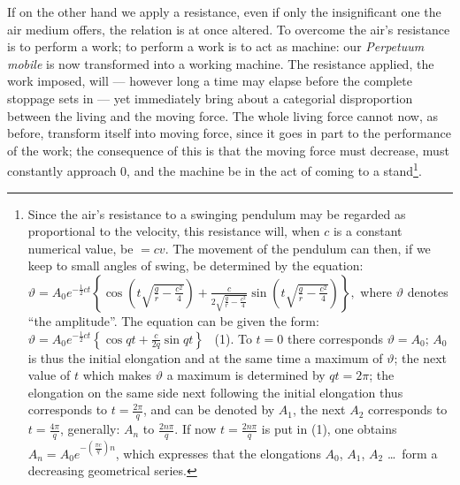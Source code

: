 \documentclass[12pt,a4paper]{book}
\begin{document}
If on the other hand we apply a resistance, even if only the insignificant one the
air medium offers, the relation is at once altered. To overcome the air's resistance
is to perform a work; to perform a work is to act as machine: our
\textit{Perpetuum mobile} is now transformed into a working machine. The resistance
applied, the work imposed, will --- however long a time may elapse before the
complete stoppage sets in --- yet immediately bring about a categorial disproportion
between the living and the moving force. The whole living force cannot now, as
before, transform itself into moving force, since it goes in part to the performance
of the work; the consequence of this is that the moving force must decrease, must
constantly approach 0, and the machine be in the act of coming to a
stand\footnote{Since the air's resistance to a swinging pendulum may be regarded as
proportional to the velocity, this resistance will, when $c$ is a constant numerical
value, be $= cv$. The movement of the pendulum can then, if we keep to small angles
of swing, be determined by the equation:
$\vartheta = A_0 e^{-\frac{1}{2}ct}\left\lbrace \cos\left(t\sqrt{\frac{g}{r}
- \frac{c^2}{4}}\right) + \frac{c}{2\sqrt{\frac{g}{r} - \frac{c^2}{4}}}
\sin\left(t\sqrt{\frac{g}{r} - \frac{c^2}{4}}\right)\right\rbrace,$
where $\vartheta$ denotes ``the amplitude''. The equation can be given the form:
$\vartheta = A_0 e^{-\frac{1}{2}ct}\left\lbrace\cos qt + \frac{c}{2q}
\sin qt\right\rbrace$ \ (1).
To $t = 0$ there corresponds $\vartheta = A_0$; $A_0$ is thus the initial elongation
and at the same time a maximum of $\vartheta$; the next value of $t$ which makes
$\vartheta$ a maximum is determined by $qt = 2\pi$; the elongation on the same side
next following the initial elongation thus corresponds to $t = \frac{2\pi}{q}$, and
can be denoted by $A_1$, the next $A_2$ corresponds to $t = \frac{4\pi}{q}$,
generally: $A_n$ to $\frac{2n\pi}{q}$. If now $t = \frac{2n\pi}{q}$ is put in (1),
one obtains $A_n = A_0 e^{-\left(\frac{\pi c}{q}\right)n}$, which expresses that the
elongations $A_0$, $A_1$, $A_2$ \ldots\ form a decreasing geometrical series.}.
\end{document}
